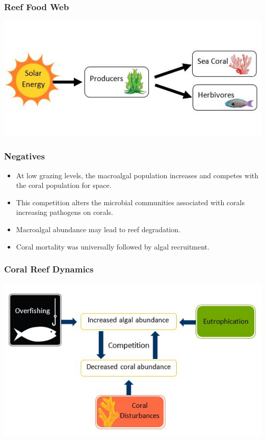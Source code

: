 \begin{frame}
\frametitle{Reef Food Web}
\includegraphics[scale=.8]{./CoralFoodWeb}
\end{frame}

\begin{frame}
\frametitle{Negatives}
\begin{itemize}
\item At low grazing levels, the macroalgal population increases and competes with the coral population for space.
\item This competition alters the microbial communities associated with corals increasing pathogens on corals.
\item Macroalgal abundance may lead to reef degradation.
\item Coral mortality was universally followed by algal recruitment.
\end{itemize}
\end{frame}

\begin{frame}
\frametitle{Coral Reef Dynamics}
\includegraphics[scale=.7]{./CoralDynamics}
\end{frame}

